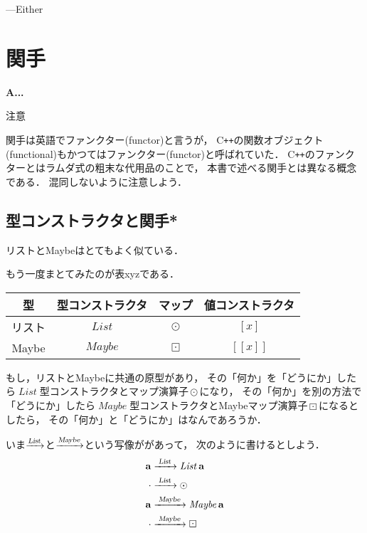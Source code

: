 \documentclass[a5paper,draft]{jsbook}
\def\[{\left[\!\left[}
\def\]{\right]\!\right]}
\newcommand{\programminglanguage}[1]{\textsf{#1}}
\newcommand{\cxx}{\programminglanguage{C}\texttt{++}}
\newenvironment{leader}{\begingroup\bf}{\endgroup}
\newenvironment{caution}{\begin{boxnote}\begin{center}注意\end{center}}{\end{boxnote}}
\newcommand{\mathTypeParameter}[1]{\mathbf{#1}}
\newcommand{\mathFunctor}[1]{\mathop{\textsl{#1}}} %
\newcommand{\mathTypeConstructor}[1]{\mathit{#1}} %
\newcommand{\mathListWith}[1]{\left[#1\right]}
\newcommand{\mathMaybeWith}[1]{\[#1\]}
\newcommand{\mathPureWith}[1]{\left\langle#1\right\rangle}
\DeclareMathOperator{\mathList}{\mathTypeConstructor{List}}
\DeclareMathOperator{\mathMaybe}{\mathTypeConstructor{Maybe}}
\newcommand{\mathBinaryOperator}[1]{\operatorname{#1}}
\newcommand{\mathGeneralMap}{\mathBinaryOperator{\cdot}}
\newcommand{\mathMap}{\mathBinaryOperator{\odot}}
\newcommand{\mathMaybeMap}{\mathBinaryOperator{\boxdot}}
\begin{document}
---Either

\chapter{関手}
\label{ch:functor}

\begin{leader}
A...
\end{leader}

\begin{caution}
関手は英語でファンクター(functor)と言うが，
\cxx の関数オブジェクト(functional)もかつてはファンクター(functor)と呼ばれていた．
\cxx のファンクターとはラムダ式の粗末な代用品のことで，
本書で述べる関手とは異なる概念である．
混同しないように注意しよう．
\end{caution}


\section{型コンストラクタと関手*}

リストとMaybeはとてもよく似ている．

もう一度まとてみたのが表xyzである．

\begin{table}
\begin{center}
\begin{tabular}{||c|c|c|c||}\hline
型&型コンストラクタ&マップ&値コンストラクタ\\\hline\hline
リスト&$\mathList$&$\mathMap$&$\mathListWith{x}$\\
Maybe&$\mathMaybe$&$\mathMaybeMap$&$\mathMaybeWith{x}$\\\hline
\end{tabular}
\end{center}
\end{table}

もし，リストとMaybeに共通の原型があり，
その「何か」を「どうにか」したら$\mathList$型コンストラクタとマップ演算子$\mathMap$になり，
その「何か」を別の方法で「どうにか」したら$\mathMaybe$型コンストラクタとMaybeマップ演算子$\mathMaybeMap$になるとしたら，
その「何か」と「どうにか」はなんであろうか．

いま$\xrightarrow{\mathFunctor{List}}$と$\xrightarrow{\mathFunctor{Maybe}}$という写像ががあって，
次のように書けるとしよう．
\begin{align}
\mathTypeParameter{a}&\xrightarrow{\;\mathFunctor{List}\;}\mathList\mathTypeParameter{a}\\
\mathGeneralMap&\xrightarrow{\;\mathFunctor{List}\;}\mathMap\\
\mathTypeParameter{a}&\xrightarrow{\;\mathFunctor{Maybe}\;}\mathMaybe\mathTypeParameter{a}\\
\mathGeneralMap&\xrightarrow{\;\mathFunctor{Maybe}\;}\mathMaybeMap
\end{align}
\end{document}
